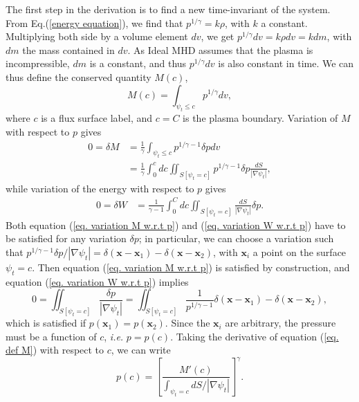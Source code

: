 \documentclass[my_thesis.tex]{subfiles}
\begin{document}
The first step in the derivation is to find a new time-invariant of the system. From Eq.(\ref{energy equation}), we find that $p^{1/\gamma} = k\rho$, with $k$ a constant. Multiplying both side by a volume element $dv$, we get $p^{1/\gamma}dv = k\rho dv = k dm$, with $dm$ the mass contained in $dv$. As Ideal MHD assumes that the plasma is incompressible, $dm$ is a constant, and thus $p^{1/\gamma}dv$ is also constant in time. We can thus define the conserved quantity $M(c)$,
\begin{equation}
	M(c) = \int_{\psi_t\leq c} p^{1/\gamma}dv, \label{eq. def M}
\end{equation}
where $c$ is a flux surface label, and $c=C$ is the plasma boundary. Variation of $M$ with respect to $p$ gives
\begin{align}
	0=\delta M &= \frac{1}{\gamma}\int_{\psi_t\leq c} p^{1/\gamma-1}\delta pdv\\
	&=\frac{1}{\gamma}\int_0^c dc \iint_{S[\psi_t=c]} p^{1/\gamma-1}\delta p\frac{dS}{|\nabla\psi_t|}, \label{eq. variation M w.r.t p}
\end{align}
while variation of the energy with respect to $p$ gives
\begin{align}
	0=\delta W &= \frac{1}{\gamma-1} \int_0^C dc \iint_{S[\psi_t=c]} \frac{dS}{|\nabla\psi_t|}\delta p. \label{eq. variation W w.r.t p}
\end{align}
Both equation (\ref{eq. variation M w.r.t p}) and (\ref{eq. variation W w.r.t p}) have to be satisfied for any variation $\delta p$; in particular, we can choose a variation such that $p^{1/\gamma-1}\delta p/|\nabla \psi_t| = \delta(\mathbf{x}-\mathbf{x}_1)-\delta(\mathbf{x}-\mathbf{x}_2)$, with $\mathbf{x}_i$ a point on the surface $\psi_t=c$. Then equation (\ref{eq. variation M w.r.t p}) is satisfied by construction, and equation (\ref{eq. variation W w.r.t p}) implies
\begin{equation}
	0 = \iint_{S[\psi_t=c]}\frac{\delta p}{|\nabla \psi_t|} = \iint_{S[\psi_t=c]}\frac{1}{p^{1/\gamma-1}}\delta(\mathbf{x}-\mathbf{x}_1)-\delta(\mathbf{x}-\mathbf{x}_2),
\end{equation}
which is satisfied if $p(\mathbf{x}_1)=p(\mathbf{x}_2)$. Since the $\mathbf{x}_i$ are arbitrary, the pressure must be a function of $c$, \textit{i.e.} $p = p(c)$. Taking the derivative of equation (\ref{eq. def M}) with respect to $c$, we can write
\begin{equation}
	p(c) = \left[\frac{M'(c)}{\int_{\psi_t=c}dS/|\nabla\psi_t|}\right]^\gamma.
\end{equation}
\end{document}
